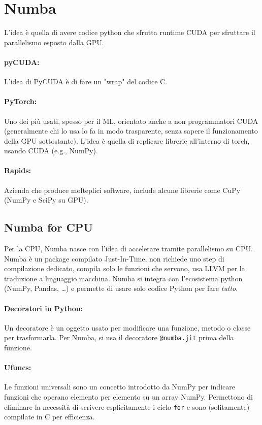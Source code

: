 \section{Numba}

L'idea è quella di avere codice python che sfrutta runtime CUDA per sfruttare il parallelismo esposto dalla GPU.

\paragraph{pyCUDA:} L'idea di PyCUDA è di fare un "wrap" del codice C.

\paragraph{PyTorch:} Uno dei più usati, spesso per il ML, orientato anche a non programmatori CUDA (generalmente chi lo usa lo fa in modo trasparente, senza sapere il funzionamento della GPU sottostante). L'idea è quella di replicare librerie all'interno di torch, usando CUDA (e.g., NumPy).

\paragraph{Rapids:} Azienda che produce molteplici software, include alcune librerie come CuPy (NumPy e SciPy su GPU). 

\subsection{Numba for CPU}

Per la CPU, Numba nasce con l'idea di accelerare tramite parallelismo su CPU.  Numba è un package compilato Just-In-Time, non richiede uno step di compilazione dedicato, compila solo le funzioni che servono, usa LLVM per la traduzione a linguaggio macchina. Numba si integra con l'ecosistema python (NumPy, Pandas, \dots) e permette di usare solo codice Python per fare \textit{tutto}.

\paragraph{Decoratori in Python:} Un decoratore è un oggetto usato per modificare una funzione, metodo o classe per trasformarla. Per Numba, si usa il decoratore \texttt{@numba.jit} prima della funzione. 

\paragraph{Ufuncs:} Le funzioni universali sono un concetto introdotto da NumPy per indicare funzioni che operano elemento per elemento su un array NumPy. Permettono di eliminare la necessità di scrivere esplicitamente i ciclo \texttt{for} e sono (solitamente) compilate in C per efficienza. 

